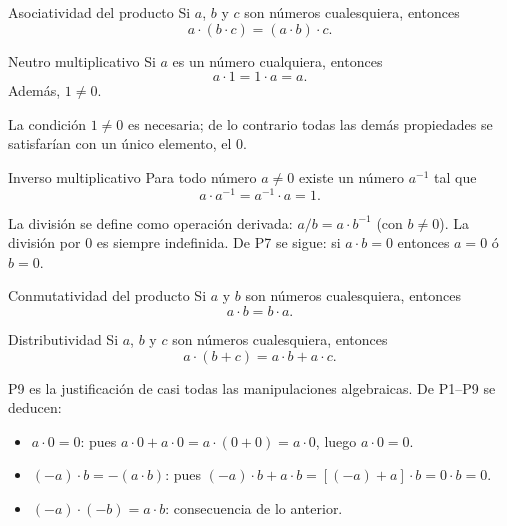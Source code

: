 \documentclass[12pt]{article}
\begin{document}
\begin{axioma}[P5]{Asociatividad del producto}
Si $a$, $b$ y $c$ son números cualesquiera, entonces
\[ a \cdot (b \cdot c) = (a \cdot b) \cdot c. \]
\end{axioma}

\begin{axioma}[P6]{Neutro multiplicativo}
Si $a$ es un número cualquiera, entonces
\[ a \cdot 1 = 1 \cdot a = a. \]
Además, $1 \neq 0$.
\end{axioma}

\begin{nota}[]{}
La condición $1 \neq 0$ es necesaria; de lo contrario todas las demás propiedades se satisfarían con un único elemento, el $0$.
\end{nota}

\begin{axioma}[P7]{Inverso multiplicativo}
Para todo número $a \neq 0$ existe un número $a^{-1}$ tal que
\[ a \cdot a^{-1} = a^{-1} \cdot a = 1. \]
\end{axioma}

\begin{nota}[]{}
La división se define como operación derivada: $a/b = a \cdot b^{-1}$ (con $b \neq 0$). La división por $0$ es siempre indefinida. De P7 se sigue: si $a \cdot b = 0$ entonces $a = 0$ ó $b = 0$.
\end{nota}

\begin{axioma}[P8]{Conmutatividad del producto}
Si $a$ y $b$ son números cualesquiera, entonces
\[ a \cdot b = b \cdot a. \]
\end{axioma}

\begin{axioma}[P9]{Distributividad}
Si $a$, $b$ y $c$ son números cualesquiera, entonces
\[ a \cdot (b + c) = a \cdot b + a \cdot c. \]
\end{axioma}

\begin{nota}[]{}
P9 es la justificación de casi todas las manipulaciones algebraicas. De P1--P9 se deducen:
\begin{itemize}
  \item $a \cdot 0 = 0$: pues $a \cdot 0 + a \cdot 0 = a \cdot (0+0) = a \cdot 0$, luego $a \cdot 0 = 0$.
  \item $(-a) \cdot b = -(a \cdot b)$: pues $(-a) \cdot b + a \cdot b = [(-a)+a] \cdot b = 0 \cdot b = 0$.
  \item $(-a) \cdot (-b) = a \cdot b$: consecuencia de lo anterior.
\end{itemize}
\end{nota}
\end{document}
